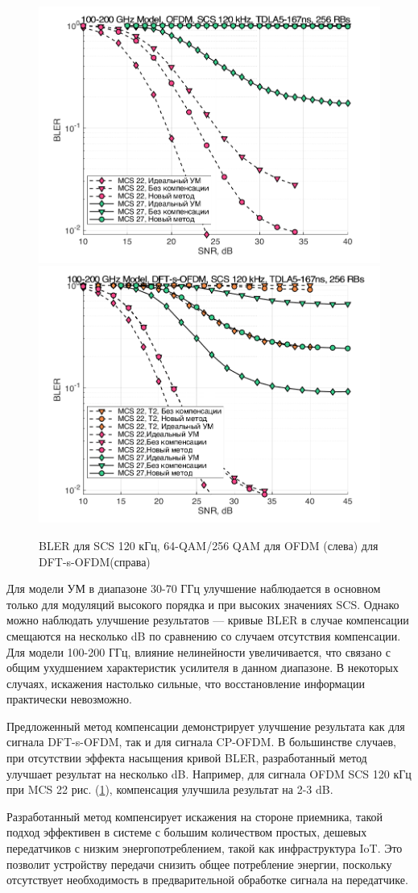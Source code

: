 \documentclass{unn}
\begin{document}
\begin{figure}[h!]
    \centering
    \includegraphics[width=0.49\linewidth]{figs/res/ofdm/OFDM_SubTHz_SCS120_MCS22_27.png}
    \includegraphics[width=0.49\linewidth]{figs/res/dftsofdm/DFT-s-OFDM_SubTHz_SCS120_MCS22_27.png}
    \caption{BLER для SCS 120 кГц, 64-QAM/256 QAM для OFDM (слева) для DFT-s-OFDM(справа)}
    \label{fig:res100200_scs120}
\end{figure}
Для модели УМ в диапазоне 30-70 ГГц улучшение наблюдается в основном только
для модуляций высокого порядка и при высоких значениях SCS. Однако можно
наблюдать улучшение результатов — кривые BLER в случае компенсации
смещаются на несколько dB по сравнению со случаем отсутствия компенсации.
Для модели 100-200 ГГц, влияние нелинейности увеличивается, что связано
с общим ухудшением характеристик усилителя в данном диапазоне. В некоторых
случаях, искажения настолько сильные, что восстановление информации
практически невозможно.

Предложенный метод компенсации демонстрирует улучшение результата как для
сигнала DFT-s-OFDM, так и для сигнала CP-OFDM. В большинстве случаев, при
отсутствии эффекта насыщения кривой BLER, разработанный метод улучшает
результат на несколько dB. Например, для сигнала OFDM SCS 120 кГц при MCS
22 рис. (\ref{fig:res100200_scs120}), компенсация улучшила результат на 2-3
dB.

Разработанный метод компенсирует искажения на стороне приемника, такой подход
эффективен в системе с большим количеством простых, дешевых передатчиков с
низким энергопотреблением, такой как инфраструктура IoT. Это позволит
устройству передачи снизить общее потребление энергии, поскольку
отсутствует необходимость в предварительной обработке сигнала на
передатчике.
\end{document}
